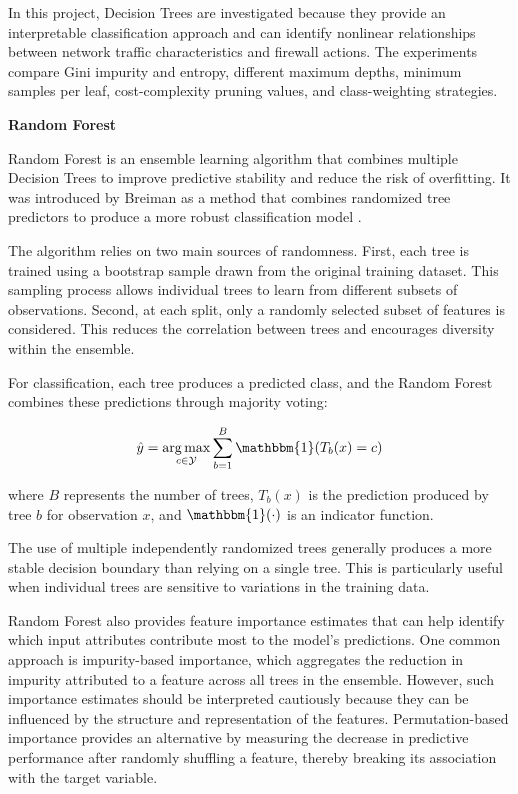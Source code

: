 In this project, Decision Trees are investigated because they provide an interpretable classification approach and can identify nonlinear relationships between network traffic characteristics and firewall actions. The experiments compare Gini impurity and entropy, different maximum depths, minimum samples per leaf, cost-complexity pruning values, and class-weighting strategies.

\textbf{Random Forest}

Random Forest is an ensemble learning algorithm that combines multiple Decision Trees to improve predictive stability and reduce the risk of overfitting. It was introduced by Breiman as a method that combines randomized tree predictors to produce a more robust classification model \cite{breiman2001random}.

The algorithm relies on two main sources of randomness. First, each tree is trained using a bootstrap sample drawn from the original training dataset. This sampling process allows individual trees to learn from different subsets of observations. Second, at each split, only a randomly selected subset of features is considered. This reduces the correlation between trees and encourages diversity within the ensemble.

For classification, each tree produces a predicted class, and the Random Forest combines these predictions through majority voting:

\begin{equation}
    \hat{y}
    =
    \underset{c \in \mathcal{Y}}{\arg\max}
    \sum_{b=1}^{B}
    \mathbbm{1}(T_b(x)=c)
    \label{eq:random-forest-voting}
\end{equation}

where $B$ represents the number of trees, $T_b(x)$ is the prediction produced by tree $b$ for observation $x$, and $\mathbbm{1}(\cdot)$ is an indicator function.

The use of multiple independently randomized trees generally produces a more stable decision boundary than relying on a single tree. This is particularly useful when individual trees are sensitive to variations in the training data.

Random Forest also provides feature importance estimates that can help identify which input attributes contribute most to the model's predictions. One common approach is impurity-based importance, which aggregates the reduction in impurity attributed to a feature across all trees in the ensemble. However, such importance estimates should be interpreted cautiously because they can be influenced by the structure and representation of the features. Permutation-based importance provides an alternative by measuring the decrease in predictive performance after randomly shuffling a feature, thereby breaking its association with the target variable.

